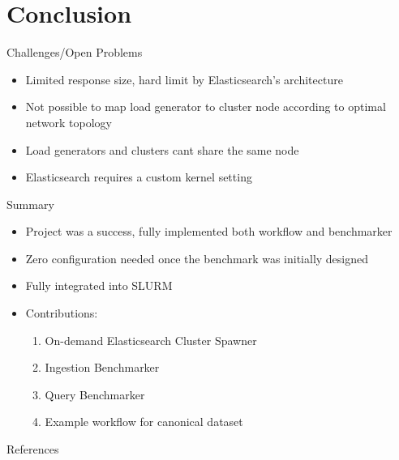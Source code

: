 \documentclass[compress,aspectratio=169]{beamer}
\begin{document}
	\section{Conclusion}
  \begin{frame}{Challenges/Open Problems}
    \begin{itemize}
      \item Limited response size, hard limit by Elasticsearch's architecture
      \item Not possible to map load generator to cluster node according to optimal network topology
      \item Load generators and clusters cant share the same node
      \item Elasticsearch requires a custom kernel setting
    \end{itemize}
  \end{frame}

	\begin{frame}{Summary}
		\label{pg:lastpage} %
    \begin{itemize}
      \item Project was a success, fully implemented both workflow and benchmarker
      \item Zero configuration needed once the benchmark was initially designed
      \item Fully integrated into SLURM
      \item Contributions:
        \begin{enumerate}
          \item On-demand Elasticsearch Cluster Spawner
          \item Ingestion Benchmarker
          \item Query Benchmarker
          \item Example workflow for canonical dataset
        \end{enumerate}
    \end{itemize}
	\end{frame}
\begin{frame}[allowframebreaks]{References}
\renewcommand*{\bibfont}{\normalfont\scriptsize}
  \printbibliography
\end{frame}
\end{document}

